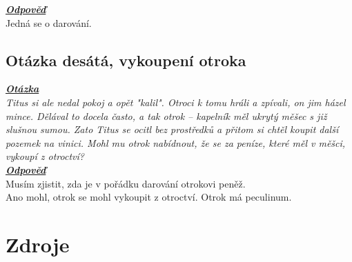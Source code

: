 \documentclass{article}
\begin{document}
\noindent\noindent\textbf{\textit{\underline{Odpověď}}}\\

Jedná se o darování.

\subsection{Otázka desátá, vykoupení otroka}
\textbf{\textit{\underline{Otázka}}}\\
\textit{Titus si ale nedal pokoj a opět "kalil". Otroci k tomu hráli a zpívali, on jim házel mince. Dělával to docela často, a tak otrok – kapelník měl ukrytý měšec s již slušnou sumou. Zato Titus se ocitl bez prostředků a přitom si chtěl koupit další pozemek na vinici. Mohl mu otrok nabídnout, že se za peníze, které měl v měšci, vykoupí z otroctví?}\\

\noindent\noindent\textbf{\textit{\underline{Odpověď}}}\\

Musím zjistit, zda je v pořádku darování otrokovi peněž.\\
Ano mohl, otrok se mohl vykoupit z otroctví.
Otrok má peculinum.

\newpage
\thispagestyle{Contents}
\section*{Zdroje}
\setcounter{SecZdroje}{\thesection}
\addtocounter{SecZdroje}{1}
\printbibliography[type=misc,heading=subbibliography,title={Online zdroje}]
\printbibliography[type=book,heading=subbibliography,title={Knižní zdroje}]
\printbibliography[type=article,heading=subbibliography,title={Články}]
\end{document}
